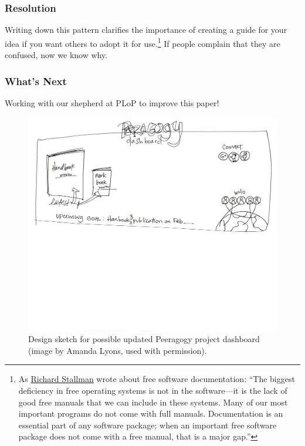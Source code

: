 \subsubsection*{Resolution}
Writing down this pattern clarifies the importance of creating a guide for your idea if you want others to adopt it for use.\footnote{As \href{https://www.gnu.org/philosophy/free-doc.html}{Richard Stallman} wrote about free software documentation: ``The biggest deficiency in free operating systems is not in the software—it is the lack of good free manuals that we can include in these systems. Many of our most important programs do not come with full manuals. Documentation is an essential part of any software package; when an important free software package does not come with a free manual, that is a major gap.''}  If people complain that they are confused, now we know why.

\subsubsection*{What's Next} 
Working with our shepherd at PLoP to improve this paper!


\begin{figure}
\includegraphics[width=\textwidth,trim=0mm 135mm 0mm 0mm,clip=true]{figures/peeragogy_dashboard_draft1/peeragogy_dashboard_draft1.jpg}
\caption{Design sketch for possible updated Peeragogy project dashboard (image by Amanda Lyons, used with permission).}
\end{figure}
